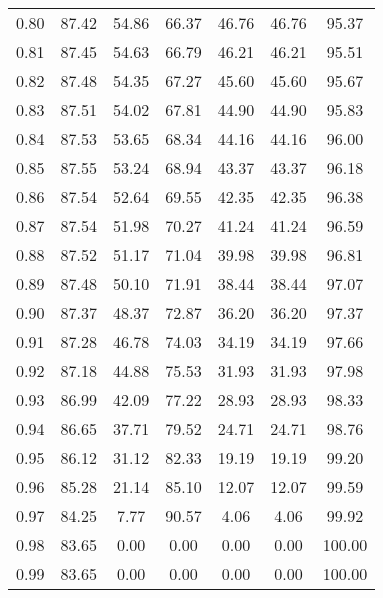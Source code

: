\begin{tabular}{|c|c|c|c|c|c|c|}
      0.80 &     87.42 &     54.86 &      66.37 &   46.76 &      46.76 &         95.37 \\
      0.81 &     87.45 &     54.63 &      66.79 &   46.21 &      46.21 &         95.51 \\
      0.82 &     87.48 &     54.35 &      67.27 &   45.60 &      45.60 &         95.67 \\
      0.83 &     87.51 &     54.02 &      67.81 &   44.90 &      44.90 &         95.83 \\
      0.84 &     87.53 &     53.65 &      68.34 &   44.16 &      44.16 &         96.00 \\
      0.85 &     87.55 &     53.24 &      68.94 &   43.37 &      43.37 &         96.18 \\
      0.86 &     87.54 &     52.64 &      69.55 &   42.35 &      42.35 &         96.38 \\
      0.87 &     87.54 &     51.98 &      70.27 &   41.24 &      41.24 &         96.59 \\
      0.88 &     87.52 &     51.17 &      71.04 &   39.98 &      39.98 &         96.81 \\
      0.89 &     87.48 &     50.10 &      71.91 &   38.44 &      38.44 &         97.07 \\
      0.90 &     87.37 &     48.37 &      72.87 &   36.20 &      36.20 &         97.37 \\
      0.91 &     87.28 &     46.78 &      74.03 &   34.19 &      34.19 &         97.66 \\
      0.92 &     87.18 &     44.88 &      75.53 &   31.93 &      31.93 &         97.98 \\
      0.93 &     86.99 &     42.09 &      77.22 &   28.93 &      28.93 &         98.33 \\
      0.94 &     86.65 &     37.71 &      79.52 &   24.71 &      24.71 &         98.76 \\
      0.95 &     86.12 &     31.12 &      82.33 &   19.19 &      19.19 &         99.20 \\
      0.96 &     85.28 &     21.14 &      85.10 &   12.07 &      12.07 &         99.59 \\
      0.97 &     84.25 &      7.77 &      90.57 &    4.06 &       4.06 &         99.92 \\
      0.98 &     83.65 &      0.00 &       0.00 &    0.00 &       0.00 &        100.00 \\
      0.99 &     83.65 &      0.00 &       0.00 &    0.00 &       0.00 &        100.00 \\
\bottomrule
\end{tabular}
